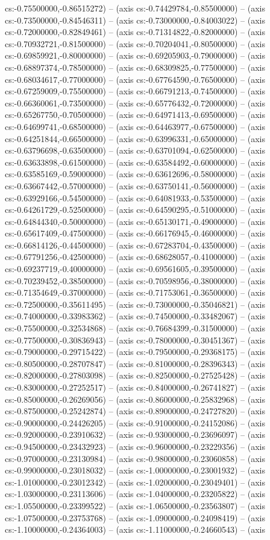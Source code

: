 cs:-0.75500000,-0.86515272) -- (axis cs:-0.74429784,-0.85500000) -- (axis cs:-0.73500000,-0.84546311) -- (axis cs:-0.73000000,-0.84003022) -- (axis cs:-0.72000000,-0.82849461) -- (axis cs:-0.71314822,-0.82000000) -- (axis cs:-0.70932721,-0.81500000) -- (axis cs:-0.70204041,-0.80500000) -- (axis cs:-0.69859921,-0.80000000) -- (axis cs:-0.69205903,-0.79000000) -- (axis cs:-0.68897374,-0.78500000) -- (axis cs:-0.68309825,-0.77500000) -- (axis cs:-0.68034617,-0.77000000) -- (axis cs:-0.67764590,-0.76500000) -- (axis cs:-0.67259009,-0.75500000) -- (axis cs:-0.66791213,-0.74500000) -- (axis cs:-0.66360061,-0.73500000) -- (axis cs:-0.65776432,-0.72000000) -- (axis cs:-0.65267750,-0.70500000) -- (axis cs:-0.64971413,-0.69500000) -- (axis cs:-0.64699741,-0.68500000) -- (axis cs:-0.64463977,-0.67500000) -- (axis cs:-0.64251844,-0.66500000) -- (axis cs:-0.63996331,-0.65000000) -- (axis cs:-0.63796698,-0.63500000) -- (axis cs:-0.63701094,-0.62500000) -- (axis cs:-0.63633898,-0.61500000) -- (axis cs:-0.63584492,-0.60000000) -- (axis cs:-0.63585169,-0.59000000) -- (axis cs:-0.63612696,-0.58000000) -- (axis cs:-0.63667442,-0.57000000) -- (axis cs:-0.63750141,-0.56000000) -- (axis cs:-0.63929166,-0.54500000) -- (axis cs:-0.64081933,-0.53500000) -- (axis cs:-0.64261729,-0.52500000) -- (axis cs:-0.64590295,-0.51000000) -- (axis cs:-0.64844340,-0.50000000) -- (axis cs:-0.65130171,-0.49000000) -- (axis cs:-0.65617409,-0.47500000) -- (axis cs:-0.66176945,-0.46000000) -- (axis cs:-0.66814126,-0.44500000) -- (axis cs:-0.67283704,-0.43500000) -- (axis cs:-0.67791256,-0.42500000) -- (axis cs:-0.68628057,-0.41000000) -- (axis cs:-0.69237719,-0.40000000) -- (axis cs:-0.69561605,-0.39500000) -- (axis cs:-0.70239452,-0.38500000) -- (axis cs:-0.70598956,-0.38000000) -- (axis cs:-0.71354649,-0.37000000) -- (axis cs:-0.71753061,-0.36500000) -- (axis cs:-0.72500000,-0.35611495) -- (axis cs:-0.73000000,-0.35046821) -- (axis cs:-0.74000000,-0.33983362) -- (axis cs:-0.74500000,-0.33482067) -- (axis cs:-0.75500000,-0.32534868) -- (axis cs:-0.76684399,-0.31500000) -- (axis cs:-0.77500000,-0.30836943) -- (axis cs:-0.78000000,-0.30451367) -- (axis cs:-0.79000000,-0.29715422) -- (axis cs:-0.79500000,-0.29368175) -- (axis cs:-0.80500000,-0.28707847) -- (axis cs:-0.81000000,-0.28396343) -- (axis cs:-0.82000000,-0.27803098) -- (axis cs:-0.82500000,-0.27525428) -- (axis cs:-0.83000000,-0.27252517) -- (axis cs:-0.84000000,-0.26741827) -- (axis cs:-0.85000000,-0.26269056) -- (axis cs:-0.86000000,-0.25832968) -- (axis cs:-0.87500000,-0.25242874) -- (axis cs:-0.89000000,-0.24727820) -- (axis cs:-0.90000000,-0.24426205) -- (axis cs:-0.91000000,-0.24152086) -- (axis cs:-0.92000000,-0.23910632) -- (axis cs:-0.93000000,-0.23696097) -- (axis cs:-0.94500000,-0.23432923) -- (axis cs:-0.96000000,-0.23229356) -- (axis cs:-0.97000000,-0.23130984) -- (axis cs:-0.98000000,-0.23060858) -- (axis cs:-0.99000000,-0.23018032) -- (axis cs:-1.00000000,-0.23001932) -- (axis cs:-1.01000000,-0.23012342) -- (axis cs:-1.02000000,-0.23049401) -- (axis cs:-1.03000000,-0.23113606) -- (axis cs:-1.04000000,-0.23205822) -- (axis cs:-1.05500000,-0.23399522) -- (axis cs:-1.06500000,-0.23563807) -- (axis cs:-1.07500000,-0.23753768) -- (axis cs:-1.09000000,-0.24098419) -- (axis cs:-1.10000000,-0.24364003) -- (axis cs:-1.11000000,-0.24660543) -- (axis 